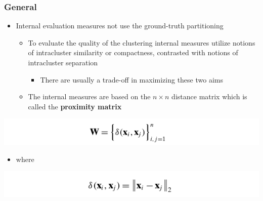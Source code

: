 \documentclass[11pt]{article}
\begin{document}
\subsubsection{General}
\label{sec:orgbe8d372}
\begin{itemize}
\item Internal evaluation measures not use the ground-truth partitioning
\begin{itemize}
\item To evaluate the quality of the clustering internal measures utilize notions of intracluster similarity or compactness, contrasted with notions of intracluster separation
\begin{itemize}
\item There are usually a trade-off in maximizing these two aims
\end{itemize}
\item The internal measures are based on the \(n \times n\) distance matrix which is called the \textbf{proximity matrix}
\end{itemize}
\end{itemize}
\begin{center}
\includegraphics[width=.9\linewidth]{Clustering Validation/screenshot_2018-11-27_23-03-15.png}
\end{center}
\begin{itemize}
\item where
\end{itemize}
\begin{center}
\includegraphics[width=.9\linewidth]{Clustering Validation/screenshot_2018-11-27_23-03-35.png}
\end{center}
\end{document}
